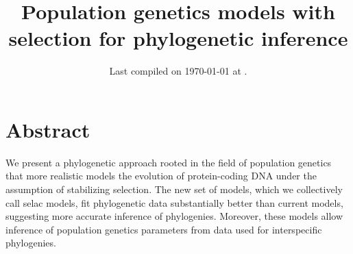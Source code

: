 \documentclass{article}
\title{Population genetics models with selection for phylogenetic
inference} \date{Last compiled on \today\xspace at \currenttime.}
\begin{document}
\maketitle


\section*{Abstract}
We present a phylogenetic approach rooted in the field of population genetics that more realistic models the evolution of protein-coding DNA under the assumption of stabilizing selection.
The new set of models, which we collectively call selac models, fit phylogenetic data substantially better than current models, suggesting more accurate inference of phylogenies.
Moreover, these models allow inference of population genetics parameters from data used for interspecific phylogenies.
\end{document}
